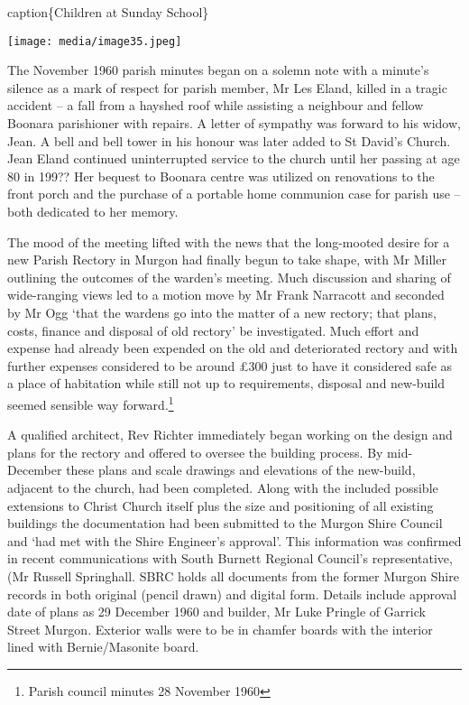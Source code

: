 caption\{Children at Sunday School\}

\texttt{[image: media/image35.jpeg]}

The November 1960 parish minutes began on a solemn note with a minute's silence as a mark of respect for parish member, Mr Les Eland, killed in a tragic accident -- a fall from a hayshed roof while assisting a neighbour and fellow Boonara parishioner with repairs. A letter of sympathy was forward to his widow, Jean. A bell and bell tower in his honour was later added to St David's Church. Jean Eland continued uninterrupted service to the church until her passing at age 80 in 199?? Her bequest to Boonara centre was utilized on renovations to the front porch and the purchase of a portable home communion case for parish use -- both dedicated to her memory.

The mood of the meeting lifted with the news that the long-mooted desire for a new Parish Rectory in Murgon had finally begun to take shape, with Mr Miller outlining the outcomes of the warden's meeting. Much discussion and sharing of wide-ranging views led to a motion move by Mr Frank Narracott and seconded by Mr Ogg `that the wardens go into the matter of a new rectory; that plans, costs, finance and disposal of old rectory' be investigated. Much effort and expense had already been expended on the old and deteriorated rectory and with further expenses considered to be around £300 just to have it considered safe as a place of habitation while still not up to requirements, disposal and new-build seemed sensible way forward.\footnote{Parish council minutes 28 November 1960}

A qualified architect, Rev Richter immediately began working on the design and plans for the rectory and offered to oversee the building process. By mid-December these plans and scale drawings and elevations of the new-build, adjacent to the church, had been completed. Along with the included possible extensions to Christ Church itself plus the size and positioning of all existing buildings the documentation had been submitted to the Murgon Shire Council and `had met with the Shire Engineer's approval'. This information was confirmed in recent communications with South Burnett Regional Council's representative, (Mr Russell Springhall. SBRC holds all documents from the former Murgon Shire records in both original (pencil drawn) and digital form. Details include approval date of plans as 29 December 1960 and builder, Mr Luke Pringle of Garrick Street Murgon. Exterior walls were to be in chamfer boards with the interior lined with Bernie/Masonite board.

